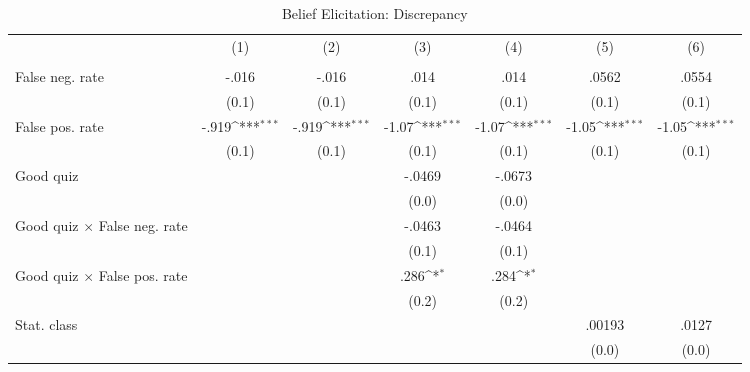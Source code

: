 \begin{table}[htbp]\centering
\def\sym#1{\ifmmode^{#1}\else\(^{#1}\)\fi}
\caption{Belief Elicitation: Discrepancy}
\begin{tabular}{l*{6}{c}}
\hline\hline
                &\multicolumn{1}{c}{(1)}&\multicolumn{1}{c}{(2)}&\multicolumn{1}{c}{(3)}&\multicolumn{1}{c}{(4)}&\multicolumn{1}{c}{(5)}&\multicolumn{1}{c}{(6)}\\
                &\multicolumn{1}{c}{}&\multicolumn{1}{c}{}&\multicolumn{1}{c}{}&\multicolumn{1}{c}{}&\multicolumn{1}{c}{}&\multicolumn{1}{c}{}\\
\hline
False neg. rate &    -.016         &    -.016         &     .014         &     .014         &    .0562         &    .0554         \\
                &    (0.1)         &    (0.1)         &    (0.1)         &    (0.1)         &    (0.1)         &    (0.1)         \\
False pos. rate &    -.919\sym{***}&    -.919\sym{***}&    -1.07\sym{***}&    -1.07\sym{***}&    -1.05\sym{***}&    -1.05\sym{***}\\
                &    (0.1)         &    (0.1)         &    (0.1)         &    (0.1)         &    (0.1)         &    (0.1)         \\
Good quiz       &                  &                  &   -.0469         &   -.0673         &                  &                  \\
                &                  &                  &    (0.0)         &    (0.0)         &                  &                  \\
Good quiz $\times$ False neg. rate&                  &                  &   -.0463         &   -.0464         &                  &                  \\
                &                  &                  &    (0.1)         &    (0.1)         &                  &                  \\
Good quiz $\times$ False pos. rate&                  &                  &     .286\sym{*}  &     .284\sym{*}  &                  &                  \\
                &                  &                  &    (0.2)         &    (0.2)         &                  &                  \\
Stat. class     &                  &                  &                  &                  &   .00193         &    .0127         \\
                &                  &                  &                  &                  &    (0.0)         &    (0.0)         \\

\end{tabular}
\end{table}

